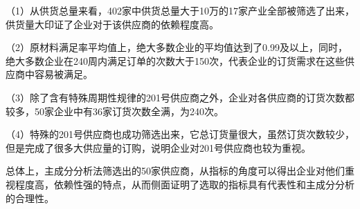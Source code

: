 \documentclass[withoutpreface,bwprint]{cumcmthesis} %
\begin{document}
（1）从供货总量来看，402家中供货总量大于10万的17家产业全部被筛选了出来，供货量大印证了企业对于该供应商的依赖程度高。

（2）原材料满足率平均值上，绝大多数企业的平均值达到了0.99及以上，同时，绝大多数企业在240周内满足订单的次数大于150次，代表企业的订货需求在这些供应商中容易被满足。

（3）除了含有特殊周期性规律的201号供应商之外，企业对各供应商的订货次数都较多，50家企业中有36家订货次数全满，为240次。

（4）特殊的201号供应商也成功筛选出来，它总订货量很大，虽然订货次数较少，但是完成了很多大供应量的订购，说明企业对201号供应商也较为重视。

总体上，主成分分析法筛选出的50家供应商，从指标的角度可以得出企业对他们重视程度高，依赖性强的特点，从而侧面证明了选取的指标具有代表性和主成分分析的合理性。










\end{document}
